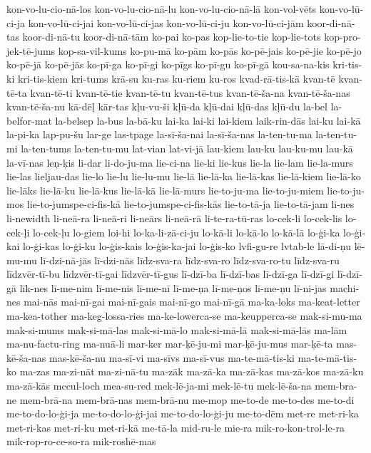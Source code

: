 {kon-vo-lu-cio-nā-los
kon-vo-lu-cio-nā-lu
kon-vo-lu-cio-nā-lā
kon-vol-vēts
kon-vo-lū-ci-ja
kon-vo-lū-ci-jai
kon-vo-lū-ci-jas
kon-vo-lū-ci-ju
kon-vo-lū-ci-jām
koor-di-nā-tas
koor-di-nā-tu
koor-di-nā-tām
ko-pai
ko-pas
kop-lie-to-tie
kop-lie-tots
kop-pro-jek-tē-jums
kop-sa-vil-kums
ko-pu-mā
ko-pām
ko-pās
ko-pē-jais
ko-pē-jie
ko-pē-jo
ko-pē-jā
ko-pē-jās
ko-pī-ga
ko-pī-gi
ko-pīgs
ko-pī-gu
ko-pī-gā
kou-sa-na-kis
kri-tis-ki
kri-tis-kiem
kri-tums
krā-su
ku-ras
ku-riem
ku-ros
kvad-rā-tis-kā
kvan-tē
kvan-tē-ta
kvan-tē-ti
kvan-tē-tie
kvan-tē-tu
kvan-tē-tus
kvan-tē-ša-na
kvan-tē-ša-nas
kvan-tē-ša-nu
kā-dēļ
kār-tas
kļu-vu-ši
kļū-da
kļū-dai
kļū-das
kļū-du
la-bel
la-belfor-mat
la-belsep
la-bus
la-bā-ku
lai-ka
lai-ki
lai-kiem
laik-rin-dās
lai-ku
lai-kā
la-pi-ka
lap-pu-šu
lar-ge
las-tpage
la-sī-ša-nai
la-sī-ša-nas
la-ten-tu-ma
la-ten-tu-mi
la-ten-tums
la-ten-tu-mu
lat-vian
lat-vi-jā
lau-kiem
lau-ku
lau-ku-mu
lau-kā
la-vī-nas
leņ-ķis
li-dar
li-do-ju-ma
lie-ci-na
lie-ki
lie-kus
lie-la
lie-lam
lie-la-murs
lie-las
lieljau-das
lie-lo
lie-lu
lie-lu-mu
lie-lā
lie-lā-ka
lie-lā-kas
lie-lā-kiem
lie-lā-ko
lie-lāks
lie-lā-ku
lie-lā-kus
lie-lā-kā
lie-lā-murs
lie-to-ju-ma
lie-to-ju-miem
lie-to-ju-mos
lie-to-jumspe-ci-fis-kā
lie-to-jumspe-ci-fis-kās
lie-to-tā-ja
lie-to-tā-jam
li-nes
li-newidth
li-neā-ra
li-neā-ri
li-neārs
li-neā-rā
li-te-ra-tū-ras
lo-cek-li
lo-cek-lis
lo-cek-ļi
lo-cek-ļu
lo-giem
loi-hi
lo-ka-li-zā-ci-ju
lo-kā-li
lo-kā-lo
lo-kā-lā
lo-ģi-ka
lo-ģi-kai
lo-ģi-kas
lo-ģi-ku
lo-ģis-kais
lo-ģis-ka-jai
lo-ģis-ko
lvfi-gu-re
lvtab-le
lā-di-ņu
lē-mu-mu
lī-dzi-nā-jās
lī-dzi-nās
līdz-sva-ra
līdz-sva-ro
līdz-sva-ro-tu
līdz-sva-ru
līdzvēr-tī-bu
līdzvēr-tī-gai
līdzvēr-tī-gus
lī-dzī-ba
lī-dzī-bas
lī-dzī-ga
lī-dzī-gi
lī-dzī-gā
līk-nes
lī-me-nim
lī-me-nis
lī-me-nī
lī-me-ņa
lī-me-ņos
lī-me-ņu
lī-ni-jas
machi-nes
mai-nās
mai-nī-gai
mai-nī-gais
mai-nī-go
mai-nī-gā
ma-ka-loks
ma-keat-letter
ma-kea-tother
ma-keg-lossa-ries
ma-ke-lowerca-se
ma-keupperca-se
mak-si-mu-ma
mak-si-mums
mak-si-mā-las
mak-si-mā-lo
mak-si-mā-lā
mak-si-mā-lās
ma-lām
ma-nu-factu-ring
ma-nuā-li
mar-ker
mar-ķē-ju-mi
mar-ķē-ju-mus
mar-ķē-ta
mas-kē-ša-nas
mas-kē-ša-nu
ma-sī-vi
ma-sīvs
ma-sī-vus
ma-te-mā-tis-ki
ma-te-mā-tis-ko
ma-zas
ma-zi-nāt
ma-zi-nā-tu
ma-zāk
ma-zā-ka
ma-zā-kas
ma-zā-kos
ma-zā-ku
ma-zā-kās
mccul-loch
mea-su-red
mek-lē-ja-mi
mek-lē-tu
mek-lē-ša-na
mem-bra-ne
mem-brā-na
mem-brā-nas
mem-brā-nu
me-mop
me-to-de
me-to-des
me-to-di
me-to-do-lo-ģi-ja
me-to-do-lo-ģi-jai
me-to-do-lo-ģi-ju
me-to-dēm
met-re
met-ri-ka
met-ri-kas
met-ri-ku
met-ri-kā
me-tā-la
mid-ru-le
mie-ra
mik-ro-kon-trol-le-ra
mik-rop-ro-ce-so-ra
mik-roshē-mas
}
